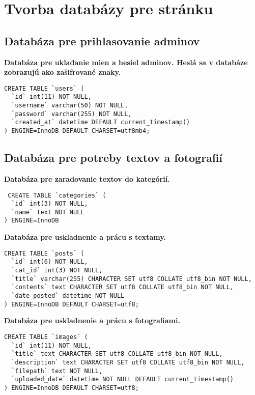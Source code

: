 \section{Tvorba databázy pre stránku}
\subsection{Databáza pre prihlasovanie adminov}
\vspace{0.5cm}
\textbf{Databáza pre ukladanie mien a hesiel adminov. Heslá sa v databáze zobrazujú ako zašifrované znaky.}
\vspace{0.5cm}
\begin{lstlisting}
CREATE TABLE `users` (
  `id` int(11) NOT NULL,
  `username` varchar(50) NOT NULL,
  `password` varchar(255) NOT NULL,
  `created_at` datetime DEFAULT current_timestamp()
) ENGINE=InnoDB DEFAULT CHARSET=utf8mb4;
\end{lstlisting}
 
 
\subsection{Databáza pre potreby textov a fotografií}
\vspace{0.5cm} 
\textbf{Databáza pre zaradovanie textov do kategórií.}
\vspace{0.5cm} 
\begin{lstlisting}
 CREATE TABLE `categories` (
  `id` int(3) NOT NULL,
  `name` text NOT NULL
) ENGINE=InnoDB
\end{lstlisting}
  
\vspace{0.5cm}  
\textbf{Databáza pre uskladnenie a prácu s textamy.}
\vspace{0.5cm}
\begin{lstlisting}
CREATE TABLE `posts` (
  `id` int(6) NOT NULL,
  `cat_id` int(3) NOT NULL,
  `title` varchar(255) CHARACTER SET utf8 COLLATE utf8_bin NOT NULL,
  `contents` text CHARACTER SET utf8 COLLATE utf8_bin NOT NULL,
  `date_posted` datetime NOT NULL
) ENGINE=InnoDB DEFAULT CHARSET=utf8;
\end{lstlisting}
  
\vspace{0.5cm}
\textbf{Databáza pre uskladnenie a prácu s fotografiami.}
\vspace{0.5cm}
\begin{lstlisting}
CREATE TABLE `images` (
  `id` int(11) NOT NULL,
  `title` text CHARACTER SET utf8 COLLATE utf8_bin NOT NULL,
  `description` text CHARACTER SET utf8 COLLATE utf8_bin NOT NULL,
  `filepath` text NOT NULL,
  `uploaded_date` datetime NOT NULL DEFAULT current_timestamp()
) ENGINE=InnoDB DEFAULT CHARSET=utf8;
\end{lstlisting}
 
